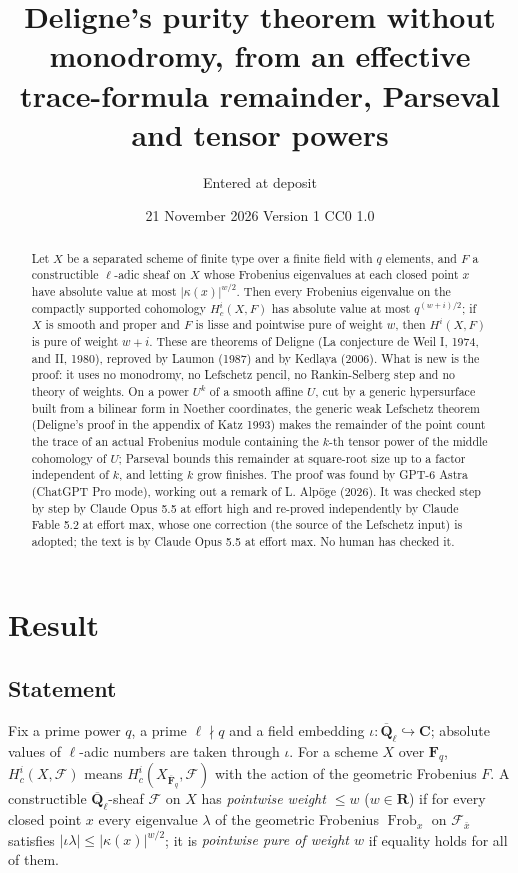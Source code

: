 \documentclass[11pt,a4paper]{article}
\title{Deligne's purity theorem without monodromy, from an effective trace-formula remainder, Parseval and tensor powers}
\author{Entered at deposit}
\date{21 November 2026 \quad Version 1 \quad CC0 1.0}
\theoremstyle{plain}
\theoremstyle{definition}
\theoremstyle{remark}
\newcommand{\Fq}{\mathbf F_q}
\newcommand{\Fqb}{\overline{\mathbf F}_q}
\newcommand{\Ql}{\overline{\mathbf Q}_\ell}
\newcommand{\F}{\mathcal F}
\newcommand{\Frob}{\operatorname{Frob}}
\begin{document}
\maketitle

\begin{abstract}
\noindent
Let $X$ be a separated scheme of finite type over a finite field with $q$ elements, and $F$ a constructible
$\ell$-adic sheaf on $X$ whose Frobenius eigenvalues at each closed point $x$ have absolute value at most
$|\kappa(x)|^{w/2}$. Then every Frobenius eigenvalue on the compactly supported cohomology $H^i_c(X,F)$ has absolute
value at most $q^{(w+i)/2}$; if $X$ is smooth and proper and $F$ is lisse and pointwise pure of weight $w$, then
$H^i(X,F)$ is pure of weight $w+i$. These are theorems of Deligne (La conjecture de Weil I, 1974, and II, 1980),
reproved by Laumon (1987) and by Kedlaya (2006). What is new is the proof: it uses no monodromy, no Lefschetz pencil, no
Rankin-Selberg step and no theory of weights. On a power $U^k$ of a smooth affine $U$, cut by a generic hypersurface
built from a bilinear form in Noether coordinates, the generic weak Lefschetz
theorem (Deligne's proof in the appendix of Katz 1993) makes the remainder of the point count the trace of an actual
Frobenius module containing the $k$-th tensor power of the middle cohomology of $U$; Parseval bounds this remainder at
square-root size up to a factor independent of $k$, and letting $k$ grow finishes. The proof was found by GPT-6 Astra (ChatGPT
Pro mode), working out a remark of L. Alp\"oge (2026). It was checked step by step by Claude Opus 5.5 at effort high and
re-proved independently by Claude Fable 5.2 at effort max, whose one correction (the source of the Lefschetz input) is
adopted; the text is by Claude Opus 5.5 at effort max. No human has checked it.
\end{abstract}

\section{Result}

\subsection{Statement}

Fix a prime power $q$, a prime $\ell\nmid q$ and a field embedding $\iota:\Ql\hookrightarrow\mathbf C$; absolute values
of $\ell$-adic numbers are taken through $\iota$. For a scheme $X$ over $\Fq$, $H^i_c(X,\F)$ means $H^i_c(X_{\Fqb},\F)$
with the action of the geometric Frobenius $F$. A constructible $\Ql$-sheaf $\F$ on $X$ has \emph{pointwise weight
$\le w$} ($w\in\mathbf R$) if for every closed point $x$ every eigenvalue $\lambda$ of the geometric Frobenius $\Frob_x$
on $\F_{\bar x}$ satisfies $|\iota\lambda|\le|\kappa(x)|^{w/2}$; it is \emph{pointwise pure of weight $w$} if equality
holds for all of them.
\end{document}
